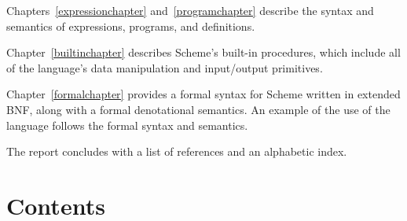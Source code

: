 \vest Chapters~\ref{expressionchapter} and~\ref{programchapter} describe
the syntax and semantics of expressions, programs, and definitions.

\vest Chapter~\ref{builtinchapter} describes Scheme's built-in
procedures, which include all of the language's data manipulation and
input/output primitives.

\vest Chapter~\ref{formalchapter} provides a formal syntax for Scheme
written in extended BNF, along with a formal denotational semantics.
An example of the use of the language follows the formal syntax and
semantics.

\vest The report concludes with a list of references and an
alphabetic index.



\vfill
\eject

\chapter*{Contents}
\addvspace{3.5pt}                  %
\renewcommand{\tocshrink}{-3.5pt}  %
{\footnotesize
\tableofcontents
}

\vfill
\eject
